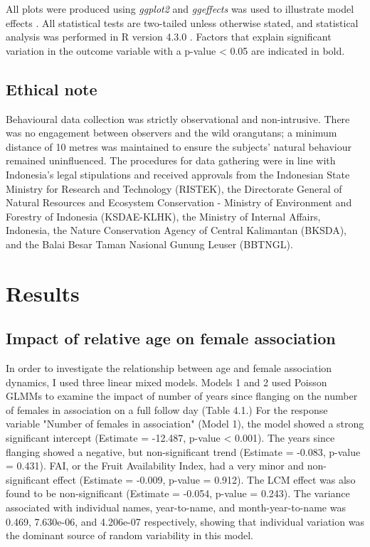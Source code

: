 All plots were produced using \textit{ggplot2} and \textit{ggeffects} was used to illustrate model effects \citep{Wickham.2011,Lüdecke.2018}. All statistical tests are two-tailed unless otherwise stated, and statistical analysis was performed in R version 4.3.0 \citep{R.2018}.  Factors that explain significant variation in the outcome variable with a p-value < 0.05 are indicated in bold.

\subsection{Ethical note}
Behavioural data collection was strictly observational and non-intrusive. There was no engagement between observers and the wild orangutans; a minimum distance of 10 metres was maintained to ensure the subjects' natural behaviour remained uninfluenced. The procedures for data gathering were in line with Indonesia's legal stipulations and received approvals from the Indonesian State Ministry for Research and Technology (RISTEK), the Directorate General of Natural Resources and Ecosystem Conservation - Ministry of Environment and Forestry of Indonesia (KSDAE-KLHK), the Ministry of Internal Affairs, Indonesia, the Nature Conservation Agency of Central Kalimantan (BKSDA), and the Balai Besar Taman Nasional Gunung Leuser (BBTNGL).

\section{Results}

\subsection{Impact of relative age on female association}

In order to investigate the relationship between age and female association dynamics, I used three linear mixed models. Models 1 and 2 used Poisson GLMMs to examine the impact of number of years since flanging on the number of females in association on a full follow day (Table 4.1.) For the response variable "Number of females in association" (Model 1), the model showed a strong significant intercept (Estimate = -12.487, p-value < 0.001). The years since flanging showed a negative, but non-significant trend (Estimate = -0.083, p-value = 0.431). FAI, or the Fruit Availability Index, had a very minor and non-significant effect (Estimate = -0.009, p-value = 0.912). The LCM effect was also found to be non-significant (Estimate = -0.054, p-value = 0.243). The variance associated with individual names, year-to-name, and month-year-to-name was 0.469, 7.630e-06, and 4.206e-07 respectively, showing that individual variation was the dominant source of random variability in this model.


